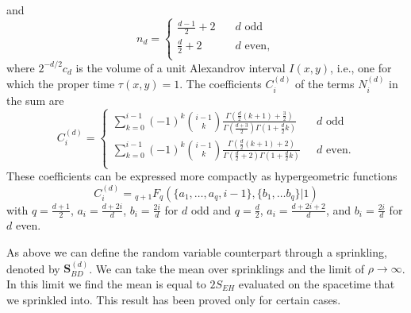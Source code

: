 \documentclass[12pt]{article}
\begin{document}
and
\begin{equation} 
n_d = 
\begin{cases} 
\frac{d-1}{2} + 2  \quad & d\mathrm{ \, \, odd}\\ 
\frac{d}{2} + 2  \quad &d\mathrm{ \, \,  even,}\\ 
\end{cases} 
\end{equation} 
where  $2^{-d/2} c_d$ is the volume of a unit Alexandrov interval $I (x,y)$, i.e., one for which the proper time $\tau (x,y)=1$. 
The coefficients $C_i^{ (d)}$ of the terms $N_i^{ (d)}$ in the sum are
\begin{equation}
\label{cid}
 C_i^{ (d)}= 
\begin{cases} 
\displaystyle\sum_{k=0}^{i-1} (-1)^k\binom{i-1}{k} \frac{\Gamma\left(\frac{d}2(k+1)+\frac32\right)}{\Gamma\left (\frac{d+3}{2}\right) \Gamma\left (1+\frac{d}2k\right)}  \quad  &d\mathrm{ \, \, odd}\\ 
\displaystyle\sum_{k=0}^{i-1} (-1)^k\binom{i-1}{k} \frac{\Gamma\left (\frac{d}2 (k+1)+2\right)}{\Gamma\left (\frac{d}2+2\right) \Gamma\left (1+\frac{d}2k\right)}  &d \mathrm{ \, \,  even.}\\ 
\end{cases} 
\end{equation} 
These coefficients can be expressed more compactly as hypergeometric functions 
\begin{equation}
C_i^{(d)}={}_{q+1}F_{q} (\{ a_1, \ldots, a_q, i-1\}, \{b_1, \ldots b_q \} |1)
\label{chyp} 
\end{equation} 
with $q=\frac{d+1}{2}$, $a_i=\frac{d+2i}{d}$, $b_i=\frac{2i}{d}$ for $d$ odd and $q=\frac{d}{2}$, $a_i=\frac{d+2i+2}{d}$, and $b_i=\frac{2i}{d}$  for $d$ even.  

As above we can define the random variable counterpart through a sprinkling, denoted by $\textbf{S}^{ (d)}_{BD}$. We can take the mean over sprinklings and the limit of $\rho\rightarrow\infty$. In this limit we find the mean is equal to $2 S_{EH}$ evaluated on the spacetime that we sprinkled into. This result has been proved only for certain cases.
\end{document}
